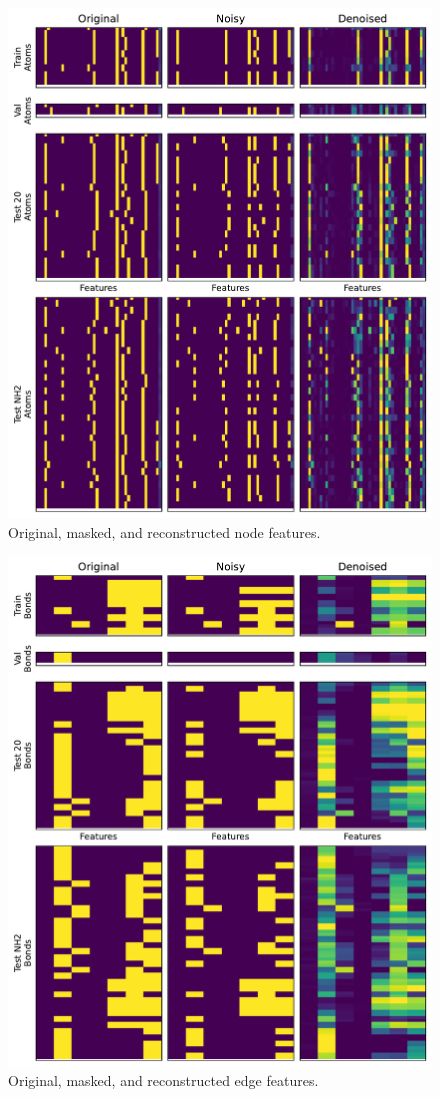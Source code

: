 \documentclass[11pt,a4paper]{article}
\begin{document}
\begin{figure}[htbp]
        \centering
        \includegraphics[width=1\textwidth]{feature_visualization_node.pdf}
        \caption{Original, masked, and reconstructed node features.}
        \label{fig:feature_visualization_node}
\end{figure}

\begin{figure}[htbp]
        \centering
        \includegraphics[width=1\textwidth]{feature_visualization_edge.pdf}
        \caption{Original, masked, and reconstructed edge features.}
        \label{fig:feature_visualization_edge}
\end{figure}
\end{document}
